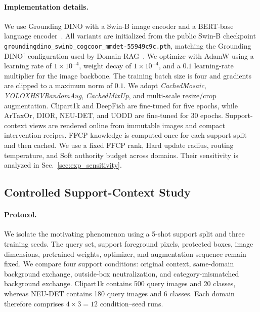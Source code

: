 \paragraph{Implementation details.}
We use Grounding DINO with a Swin-B image encoder and a BERT-base language encoder~\cite{groundingdino}. All variants are initialized from the public Swin-B checkpoint
\texttt{groundingdino\_swinb\allowbreak\_cogcoor\allowbreak\_mmdet-55949c9c.pth},
matching the Grounding DINO$^\dagger$ configuration used by Domain-RAG~\cite{domainrag}. We optimize with AdamW using a learning rate of $1\times10^{-4}$, weight decay of $1\times10^{-4}$, and a $0.1$ learning-rate multiplier for the image backbone. The training batch size is four and gradients are clipped to a maximum norm of $0.1$. We adopt \emph{CachedMosaic}, \emph{YOLOXHSVRandomAug}, \emph{CachedMixUp}, and multi-scale resize/crop augmentation. Clipart1k and DeepFish are fine-tuned for five epochs, while ArTaxOr, DIOR, NEU-DET, and UODD are fine-tuned for 30 epochs. Support-context views are rendered online from immutable images and compact intervention recipes. FFCP knowledge is computed once for each support split and then cached. We use a fixed FFCP rank, Hard update radius, routing temperature, and Soft authority budget across domains. Their sensitivity is analyzed in Sec.~\ref{sec:exp_sensitivity}.

\subsection{Controlled Support-Context Study}
\label{sec:controlled_pilot}

\paragraph{Protocol.}
We isolate the motivating phenomenon using a 5-shot support split and three training seeds. The query set, support foreground pixels, protected boxes, image dimensions, pretrained weights, optimizer, and augmentation sequence remain fixed. We compare four support conditions: original context, same-domain background exchange, outside-box neutralization, and category-mismatched background exchange. Clipart1k contains 500 query images and 20 classes, whereas NEU-DET contains 180 query images and 6 classes. Each domain therefore comprises $4\times3=12$ condition--seed runs.

